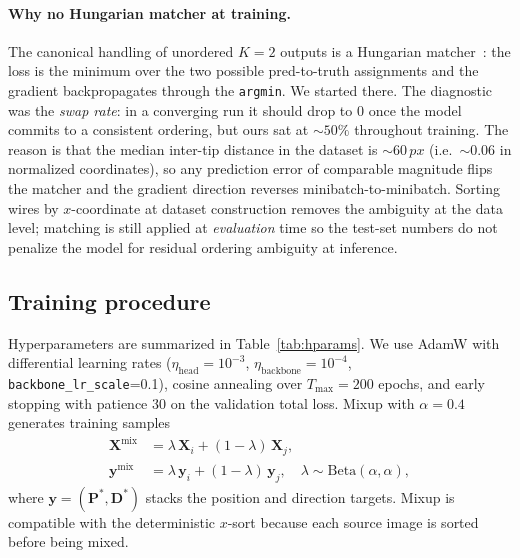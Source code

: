 \documentclass[conference,10pt,letterpaper]{IEEEtran}
\newcommand{\px}{\,px}
\begin{document}
\paragraph{Why no Hungarian matcher at training.}
The canonical handling of unordered $K{=}2$ outputs is a Hungarian
matcher~\cite{kuhn1955}: the loss is the minimum over the two possible
pred-to-truth assignments and the gradient backpropagates through the
\texttt{argmin}. We started there. The diagnostic was the \emph{swap
rate}: in a converging run it should drop to $0$ once the model commits
to a consistent ordering, but ours sat at $\sim 50\%$ throughout
training. The reason is that the median inter-tip distance in the dataset
is $\sim 60\px$ (i.e.\ $\sim 0.06$ in normalized coordinates), so any
prediction error of comparable magnitude flips the matcher and the
gradient direction reverses minibatch-to-minibatch. Sorting wires by
$x$-coordinate at dataset construction removes the ambiguity at the
data level; matching is still applied at \emph{evaluation} time so the
test-set numbers do not penalize the model for residual ordering
ambiguity at inference.

\subsection{Training procedure}
\label{sec:training}
Hyperparameters are summarized in Table~\ref{tab:hparams}. We use AdamW
\cite{loshchilov2019adamw} with differential learning rates
($\eta_\text{head}{=}10^{-3}$, $\eta_\text{backbone}{=}10^{-4}$,
\texttt{backbone\_lr\_scale}{=}0.1), cosine annealing
\cite{loshchilov2017sgdr} over $T_\text{max}{=}200$ epochs, and early
stopping with patience 30 on the validation total loss. Mixup with
$\alpha{=}0.4$ generates training samples
\begin{align}
  \mathbf{X}^{\text{mix}} &= \lambda\,\mathbf{X}_i + (1-\lambda)\,\mathbf{X}_j,\\
  \mathbf{y}^{\text{mix}} &= \lambda\,\mathbf{y}_i + (1-\lambda)\,\mathbf{y}_j,\quad
  \lambda\sim\mathrm{Beta}(\alpha,\alpha),
\end{align}
where $\mathbf{y}=(\mathbf{P}^*,\mathbf{D}^*)$ stacks the position and
direction targets. Mixup is compatible with the deterministic $x$-sort
because each source image is sorted before being mixed.
\end{document}

